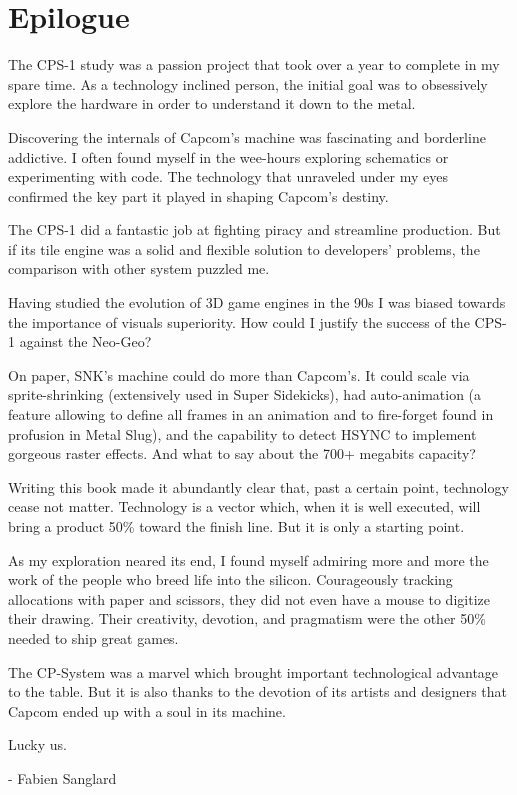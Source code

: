 \chapter{Epilogue} 

The CPS-1 study was a passion project that took over a year to complete in my spare time. As a technology inclined person, the initial goal was to obsessively explore the hardware in order to understand it down to the metal.

Discovering the internals of Capcom's machine was fascinating and borderline addictive. I often found myself in the wee-hours exploring schematics or experimenting with code. The technology that unraveled under my eyes confirmed the key part it played in shaping Capcom's destiny. 

The CPS-1 did a fantastic job at fighting piracy and streamline production. But if its tile engine was a solid and flexible solution to developers' problems, the comparison with other system puzzled me.

Having studied the evolution of 3D game engines in the 90s I was biased towards the importance of visuals superiority. How could I justify the success of the CPS-1 against the Neo-Geo? 

On paper, SNK's machine could do more than Capcom's. It could scale via sprite-shrinking (extensively used in Super Sidekicks),
had auto-animation (a feature allowing to define all frames in an animation and to fire-forget found in profusion in Metal Slug), and the capability to detect HSYNC to implement gorgeous raster effects. And what to say about the 700+ megabits capacity?

Writing this book made it abundantly clear that, past a certain point, technology cease not matter. Technology is a vector which, when it is well executed, will bring a product 50\% toward the finish line. But it is only a starting point.

As my exploration neared its end, I found myself admiring more and more the work of the people who breed life into the silicon.   
Courageously tracking allocations with paper and scissors, they did not even have a mouse to digitize their drawing. Their creativity, devotion, and pragmatism were the other 50\% needed to ship great games.

The CP-System was a marvel which brought important technological advantage to the table. But it is also thanks to the devotion of its artists and designers that Capcom ended up with a soul in its machine.

Lucky us.

- Fabien Sanglard
